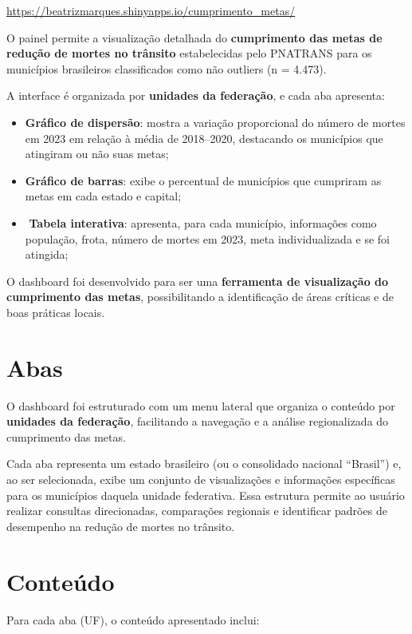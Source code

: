 \documentclass[
  letterpaper,
  DIV=11,
  numbers=noendperiod]{scrreprt}
\begin{document}
\url{https://beatrizmarques.shinyapps.io/cumprimento_metas/}

O painel permite a visualização detalhada do \textbf{cumprimento das
metas de redução de mortes no trânsito} estabelecidas pelo PNATRANS para
os municípios brasileiros classificados como não outliers (n = 4.473).

A interface é organizada por \textbf{unidades da federação}, e cada aba
apresenta:

\begin{itemize}
\item
  \textbf{Gráfico de dispersão}: mostra a variação proporcional do
  número de mortes em 2023 em relação à média de 2018--2020, destacando
  os municípios que atingiram ou não suas metas;
\item
  \textbf{Gráfico de barras}: exibe o percentual de municípios que
  cumpriram as metas em cada estado e capital;
\item
  ️ \textbf{Tabela interativa}: apresenta, para cada município,
  informações como população, frota, número de mortes em 2023, meta
  individualizada e se foi atingida;
\end{itemize}

O dashboard foi desenvolvido para ser uma \textbf{ferramenta de
visualização do cumprimento das metas}, possibilitando a identificação
de áreas críticas e de boas práticas locais.

\section{Abas}\label{abas}

O dashboard foi estruturado com um menu lateral que organiza o conteúdo
por \textbf{unidades da federação}, facilitando a navegação e a análise
regionalizada do cumprimento das metas.

Cada aba representa um estado brasileiro (ou o consolidado nacional
``Brasil'') e, ao ser selecionada, exibe um conjunto de visualizações e
informações específicas para os municípios daquela unidade federativa.
Essa estrutura permite ao usuário realizar consultas direcionadas,
comparações regionais e identificar padrões de desempenho na redução de
mortes no trânsito.

\section{Conteúdo}\label{conteuxfado}

Para cada aba (UF), o conteúdo apresentado inclui:
\end{document}

